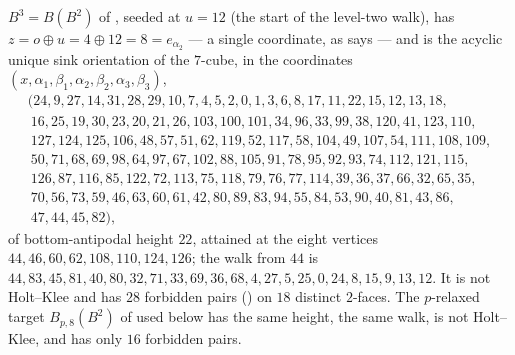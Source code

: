 \begin{proposition}\label{b3:b3}
$B^{3}=B(B^{2})$ of , seeded at $u=12$ (the start of the
level-two walk), has $z=o\oplus u=4\oplus12=8=e_{\alpha_2}$ --- a single
coordinate, as  says --- and is the acyclic unique
sink orientation of the $7$-cube, in the coordinates
$(x,\alpha_1,\beta_1,\alpha_2,\beta_2,\alpha_3,\beta_3)$,
\[\begin{array}{l}
(24, 9, 27, 14, 31, 28, 29, 10, 7, 4, 5, 2, 0, 1, 3, 6, 8, 17, 11, 22, 15, 12, 13, 18,\\
\ 16, 25, 19, 30, 23, 20, 21, 26, 103, 100, 101, 34, 96, 33, 99, 38, 120, 41, 123, 110,\\
\ 127, 124, 125, 106, 48, 57, 51, 62, 119, 52, 117, 58, 104, 49, 107, 54, 111, 108, 109,\\
\ 50, 71, 68, 69, 98, 64, 97, 67, 102, 88, 105, 91, 78, 95, 92, 93, 74, 112, 121, 115,\\
\ 126, 87, 116, 85, 122, 72, 113, 75, 118, 79, 76, 77, 114, 39, 36, 37, 66, 32, 65, 35,\\
\ 70, 56, 73, 59, 46, 63, 60, 61, 42, 80, 89, 83, 94, 55, 84, 53, 90, 40, 81, 43, 86,\\
\ 47, 44, 45, 82),
\end{array}\]
of bottom-antipodal height $22$, attained at the eight vertices
$44,46,60,62,108,110,124,126$; the walk from $44$ is
$44, 83, 45, 81, 40, 80, 32, 71, 33, 69, 36, 68, 4, 27, 5, 25, 0, 24, 8, 15, 9,
13, 12$. It is not Holt--Klee and has $28$ forbidden pairs
() on $18$ distinct $2$-faces. The $p$-relaxed target
$B_{p,8}(B^{2})$ of  used below has the same height, the
same walk, is not Holt--Klee, and has only $16$ forbidden pairs.
\end{proposition}

